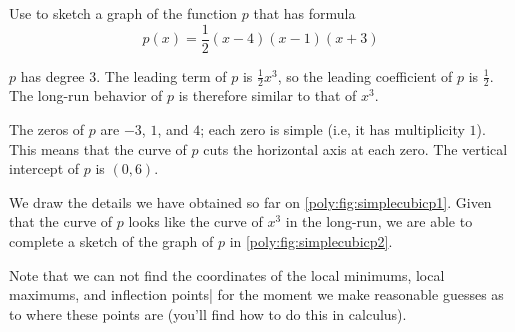  	\begin{pccexample}\label{poly:ex:simplecubic}
 		Use  to sketch a graph of the function $p$
 		that has formula
 		\[
 			p(x)=\frac{1}{2}(x-4)(x-1)(x+3)
 		\]
 		\begin{pccsolution}
 			\begin{steps}
 				\item $p$ has degree $3$. The leading term of $p$ is $\frac{1}{2}x^3$, so the leading coefficient of $p$
 				is $\frac{1}{2}$. The long-run behavior of $p$ is therefore similar to that of $x^3$.
 				\item The zeros of $p$ are $-3$, $1$, and $4$; each zero is simple (i.e, it has multiplicity $1$).
 				This means that the curve of $p$ cuts the horizontal axis at each zero. The vertical
 				intercept of $p$ is $(0,6)$.
 				\item We draw the details we have obtained so far on \cref{poly:fig:simplecubicp1}. Given
 				that the curve of $p$ looks like the curve of $x^3$ in the long-run, we are able to complete a sketch of the
 				graph of $p$ in \cref{poly:fig:simplecubicp2}.
 				 				 				
 				Note that we can not find the coordinates of the local minimums, local maximums, and inflection
 				points| for the moment we make reasonable guesses as to where these points are (you'll find how
 				to do this in calculus).
 			\end{steps}
 			 			 			

\end{pccsolution}
\end{pccexample}
